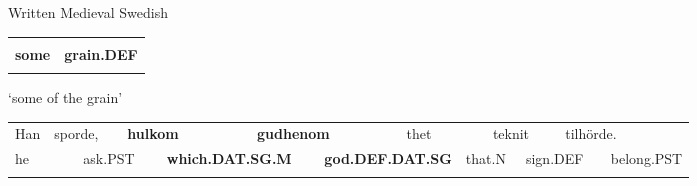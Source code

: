 
\begin{listWWNumileveli}
\item 

\begin{styleExample}
Written Medieval Swedish

\end{styleExample}

\end{listWWNumileveli}

\begin{listWWNumxlleveli}
\item 

\end{listWWNumxlleveli}

\begin{tabular}{ll}
\lsptoprule
\multicolumn{2}{l}{{\bfseries somlikin}

}\\
{\bfseries some} & {\bfseries grain.DEF}\\
\lspbottomrule
\end{tabular}

\begin{styleTranslation}
‘some of the grain’

\end{styleTranslation}

\begin{tabular}{llllllllllllll}
\lsptoprule
Han & \multicolumn{2}{l}{sporde,

} & \multicolumn{2}{l}{{\bfseries hulkom}

} & \multicolumn{2}{l}{{\bfseries gudhenom}

} & \multicolumn{2}{l}{thet

} & \multicolumn{2}{l}{teknit

} & \multicolumn{2}{l}{tilhörde.

} & \\
\multicolumn{2}{l}{he

} & \multicolumn{2}{l}{ask.PST

} & \multicolumn{2}{l}{{\bfseries which.DAT.SG.M}

} & \multicolumn{2}{l}{{\bfseries god.DEF.DAT.SG}

} & \multicolumn{2}{l}{that.N

} & \multicolumn{2}{l}{sign.DEF

} & \multicolumn{2}{l}{belong.PST

}\\
\lspbottomrule
\end{tabular}

